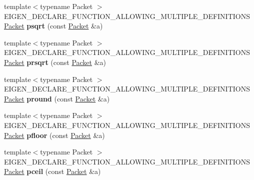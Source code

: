 \begin{DoxyCompactItemize}
\item 
\mbox{\label{namespace_eigen_1_1internal_a749f13785228504bff14b030f51319d7}} 
{\footnotesize template$<$typename Packet $>$ }\\E\+I\+G\+E\+N\+\_\+\+D\+E\+C\+L\+A\+R\+E\+\_\+\+F\+U\+N\+C\+T\+I\+O\+N\+\_\+\+A\+L\+L\+O\+W\+I\+N\+G\+\_\+\+M\+U\+L\+T\+I\+P\+L\+E\+\_\+\+D\+E\+F\+I\+N\+I\+T\+I\+O\+NS \hyperlink{union_eigen_1_1internal_1_1_packet}{Packet} {\bfseries psqrt} (const \hyperlink{union_eigen_1_1internal_1_1_packet}{Packet} \&a)
\item 
\mbox{\label{namespace_eigen_1_1internal_ae2a6f4fec545ece4df86b64228bdbe56}} 
{\footnotesize template$<$typename Packet $>$ }\\E\+I\+G\+E\+N\+\_\+\+D\+E\+C\+L\+A\+R\+E\+\_\+\+F\+U\+N\+C\+T\+I\+O\+N\+\_\+\+A\+L\+L\+O\+W\+I\+N\+G\+\_\+\+M\+U\+L\+T\+I\+P\+L\+E\+\_\+\+D\+E\+F\+I\+N\+I\+T\+I\+O\+NS \hyperlink{union_eigen_1_1internal_1_1_packet}{Packet} {\bfseries prsqrt} (const \hyperlink{union_eigen_1_1internal_1_1_packet}{Packet} \&a)
\item 
\mbox{\label{namespace_eigen_1_1internal_a7de6486f124ebaea988c6e6eb5629c31}} 
{\footnotesize template$<$typename Packet $>$ }\\E\+I\+G\+E\+N\+\_\+\+D\+E\+C\+L\+A\+R\+E\+\_\+\+F\+U\+N\+C\+T\+I\+O\+N\+\_\+\+A\+L\+L\+O\+W\+I\+N\+G\+\_\+\+M\+U\+L\+T\+I\+P\+L\+E\+\_\+\+D\+E\+F\+I\+N\+I\+T\+I\+O\+NS \hyperlink{union_eigen_1_1internal_1_1_packet}{Packet} {\bfseries pround} (const \hyperlink{union_eigen_1_1internal_1_1_packet}{Packet} \&a)
\item 
\mbox{\label{namespace_eigen_1_1internal_af761ddfbce019c99cf4a481d0d007946}} 
{\footnotesize template$<$typename Packet $>$ }\\E\+I\+G\+E\+N\+\_\+\+D\+E\+C\+L\+A\+R\+E\+\_\+\+F\+U\+N\+C\+T\+I\+O\+N\+\_\+\+A\+L\+L\+O\+W\+I\+N\+G\+\_\+\+M\+U\+L\+T\+I\+P\+L\+E\+\_\+\+D\+E\+F\+I\+N\+I\+T\+I\+O\+NS \hyperlink{union_eigen_1_1internal_1_1_packet}{Packet} {\bfseries pfloor} (const \hyperlink{union_eigen_1_1internal_1_1_packet}{Packet} \&a)
\item 
\mbox{\label{namespace_eigen_1_1internal_a9f4397f3ef4bc37449a2914ce8c16ea8}} 
{\footnotesize template$<$typename Packet $>$ }\\E\+I\+G\+E\+N\+\_\+\+D\+E\+C\+L\+A\+R\+E\+\_\+\+F\+U\+N\+C\+T\+I\+O\+N\+\_\+\+A\+L\+L\+O\+W\+I\+N\+G\+\_\+\+M\+U\+L\+T\+I\+P\+L\+E\+\_\+\+D\+E\+F\+I\+N\+I\+T\+I\+O\+NS \hyperlink{union_eigen_1_1internal_1_1_packet}{Packet} {\bfseries pceil} (const \hyperlink{union_eigen_1_1internal_1_1_packet}{Packet} \&a)

\end{DoxyCompactItemize}
